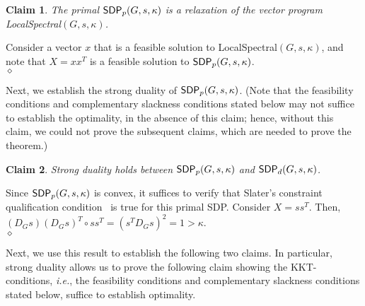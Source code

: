 \documentclass[11pt]{article}
\newtheorem{claim}{Claim}
\newenvironment{proof}{\noindent {\em Proof:}}{\\\hspace*{\fill}\mbox{$\diamond$}}
\newcommand{\sdp}{{\sf SDP}}
\begin{document}
\begin{claim}
The primal $\sdp_p(G,s, \kappa)$ is a relaxation of the vector program 
\textsf{LocalSpectral}$(G,s, \kappa)$.
\end{claim}
\begin{proof} Consider a vector $x$ that is a feasible solution to 
\textsf{LocalSpectral}$(G,s, \kappa)$, and note that $X=xx^T$ is a feasible 
solution to $\sdp_p(G,s, \kappa)$.
\end{proof}

\noindent
Next, we establish the strong duality of $\sdp_p(G,s, \kappa)$.
(Note that the feasibility conditions and
complementary slackness conditions
stated below
may not suffice to 
establish the optimality, in the absence of this claim; 
hence, without this claim, we could not prove the subsequent claims, which 
are needed to prove the theorem.)

\begin{claim}
Strong duality holds between $\sdp_p(G,s, \kappa)$ and $\sdp_d(G,s, \kappa)$.
\end{claim}
\begin{proof} Since $\sdp_p(G,s, \kappa)$ is convex, it suffices to verify that Slater's 
constraint qualification condition~\cite{Boyd04} is true for this primal SDP.
Consider $ X= {s}{s}^T$.  
Then, $(D_{G}{s})(D_{G}{s})^T \circ {s}{s}^T = ({s}^T D_{G}{s})^2 = 1>\kappa$.
\end{proof}

\noindent
Next, we use this result to establish the following two claims.
In particular, strong duality allows us to prove the following claim showing 
the KKT-conditions, \emph{i.e.}, the feasibility conditions and 
complementary slackness conditions stated below, suffice to establish
 optimality.
\end{document}
